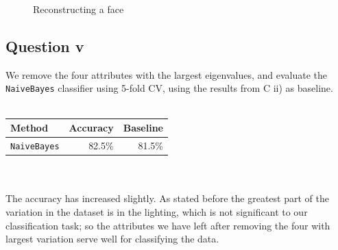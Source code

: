 \documentclass[a4paper]{article}
\begin{document}
\begin{figure}[!htbp]
\begin{center}
\end{center}
\caption{Reconstructing a face}
\label{fig:c4img1}
\end{figure}

\FloatBarrier

\subsection*{Question v}
We remove the four attributes with the largest eigenvalues, and evaluate the {\tt NaiveBayes} classifier using 5-fold CV, using the results from C ii) as baseline.\\
\\
\begin{tabular}{lrr}
Method & Accuracy & Baseline \\
\hline
{\tt NaiveBayes} & 82.5\% & 81.5\% \\
\end{tabular}\\
\\
The accuracy has increased slightly. As stated before the greatest part of the variation in the dataset is in the lighting, which is not significant to our classification task; so the attributes we have left after removing the four with largest variation serve well for classifying the data.
\end{document}
